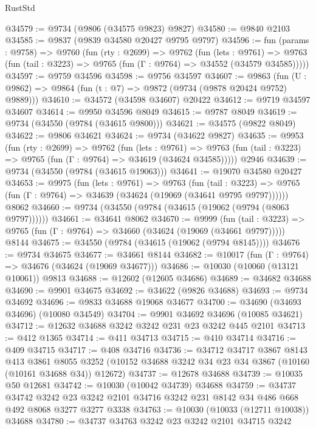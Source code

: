 \begin{lexlean}{RustStd}
\begin{coremodule}
@34579 := @9734 (@9806 (@34575 @9823) @9827)
@34580 := @9840 @2103
@34585 := @9837 (@9839 @34580 @20427 @9795 @9797)
@34596 := fun (params : @9758) =>
  @9760
    (fun (rty : @2699) =>
    @9762
      (fun (lets : @9761) =>
      @9763 (fun (tail : @3223) => @9765 (fun (Γ : @9764) => @34552 (@34579 @34585)))))
@34597 := @9759 @34596
@34598 := @9756 @34597
@34607 := @9863
    (fun (U : @9862) => @9864 (fun (t : @7) => @9872 (@9734 (@9878 @20424 @9752) @9889)))
@34610 := @34572 (@34598 @34607) @20422
@34612 := @9719 @34597 @34607
@34614 := @9950 @34596 @8049
@34615 := @9787 @8049
@34619 := @9734 (@34550 (@9784 (@34615 @9800)))
@34621 := @34575 (@9822 @8049)
@34622 := @9806 @34621
@34624 := @9734 (@34622 @9827)
@34635 := @9953
    (fun (rty : @2699) =>
    @9762
      (fun (lets : @9761) =>
      @9763 (fun (tail : @3223) => @9765 (fun (Γ : @9764) => @34619 (@34624 @34585)))))
    @2946
@34639 := @9734 (@34550 (@9784 (@34615 @19063)))
@34641 := @19070 @34580 @20427
@34653 := @9975
    (fun (lets : @9761) =>
    @9763
      (fun (tail : @3223) =>
      @9765 (fun (Γ : @9764) => @34639 (@34624 (@19069 (@34641 @9795 @9797))))))
    @8062
@34660 := @9734 (@34550 (@9784 (@34615 (@19062 (@9794 (@8063 @9797))))))
@34661 := @34641 @8062
@34670 := @9999
    (fun (tail : @3223) => @9765 (fun (Γ : @9764) => @34660 (@34624 (@19069 (@34661 @9797)))))
    @8144
@34675 := @34550 (@9784 (@34615 (@19062 (@9794 @8145))))
@34676 := @9734 @34675
@34677 := @34661 @8144
@34682 := @10017 (fun (Γ : @9764) => @34676 (@34624 (@19069 @34677)))
@34686 := @10030 (@10060 (@13121 @10061)) @9813
@34688 := @12602 (@12605 @34686)
@34689 := @34682 @34688
@34690 := @9901 @34675
@34692 := @34622 (@9826 @34688)
@34693 := @9734 @34692
@34696 := @9833 @34688 @19068 @34677
@34700 := @34690 (@34693 @34696) (@10080 @34549)
@34704 := @9901 @34692 @34696 (@10085 @34621)
@34712 := @12632 @34688 @3242 @3242 @231 @23 @3242 @445 @2101
@34713 := @412 @1365
@34714 := @411 @34713
@34715 := @410 @34714
@34716 := @409 @34715
@34717 := @408 @34716
@34736 := @34712
    @34717
    @3867
    @8143
    @413
    @3861
    @8055
    @3252
    (@10152 @34688 @3242 @34 @23 @34 @3867 (@10160 (@10161 @34688 @34)) @12672)
@34737 := @12678 @34688
@34739 := @10035 @50 @12681
@34742 := @10030 (@10042 @34739) @34688
@34759 := @34737
    @34742
    @3242
    @23
    @3242
    @2101
    @34716
    @3242
    @231
    @8142
    @34
    @486
    @668
    @492
    @8068
    @3277
    @3277
    @3338
@34763 := @10030 (@10033 (@12711 @10038)) @34688
@34780 := @34737
    @34763
    @3242
    @23
    @3242
    @2101
    @34715
    @3242

\end{coremodule}
\end{lexlean}
